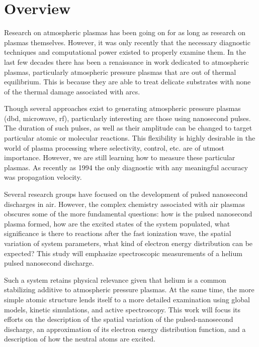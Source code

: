 \section{Overview}

Research on atmospheric plasmas has been going on for as long as research on
plasmas themselves. However, it was only recently that the necessary diagnostic
techniques and computational power existed to properly examine them. In the last
few decades there has been a renaissance in work dedicated to atmospheric
plasmas, particularly atmospheric pressure plasmas that are out of thermal
equilibrium. This is because they are able to treat delicate substrates with
none of the thermal damage associated with arcs.

Though several approaches exist to generating atmospheric pressure plasmas (dbd,
microwave, rf), particularly interesting are those using nanosecond pulses. The
duration of such pulses, as well as their amplitude can be changed to target
particular atomic or molecular reactions. This flexibility is highly desirable
in the world of plasma processing where selectivity, control, etc. are of utmost
importance. However, we are still learning how to measure these particular
plasmas. As recently as 1994 \cite{Vasilyak1994} the only diagnostic with any
meaningful accuracy was propagation velocity. 

Several research groups have focused on the development of pulsed nanosecond
discharges in air. However, the complex chemistry associated with air plasmas
obscures some of the more fundamental questions: how is the pulsed nanosecond
plasma formed, how are the excited states of the system populated, what
significance is there to reactions after the fast ionization wave, the spatial
variation of system parameters, what kind of electron energy distribution can be
expected?  This study will emphasize
spectroscopic measurements of a helium pulsed nanosecond discharge.

Such a system retains physical relevance given that helium is a common
stabilizing additive to atmospheric pressure plasmas. At the same time, the more
simple atomic structure lends itself to a more detailed examination using global
models, kinetic simulations, and active spectroscopy. This work will focus its
efforts on the description of the spatial variation of the pulsed-nanosecond
discharge, an approximation of its electron energy distribution function, and a
description of how the neutral atoms are excited.

